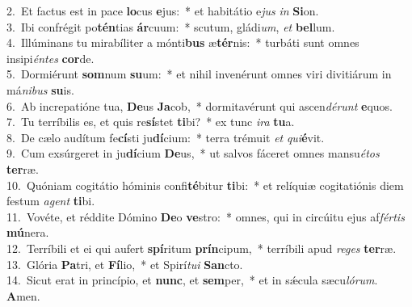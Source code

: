 {2.~}Et factus est in pace \textbf{lo}cus \textbf{e}jus:~* et habitátio e\textit{jus} \textit{in} \textbf{Si}on.\\
{3.~}Ibi confrégit po\textbf{tén}tias \textbf{ár}cuum:~* scutum, gládi\textit{um}, \textit{et} \textbf{bel}lum.\\
{4.~}Illúminans tu mirabíliter a mónti\textbf{bus} æ\textbf{tér}nis:~* turbáti sunt omnes insipi\textit{én}\textit{tes} \textbf{cor}de.\\
{5.~}Dormiérunt \textbf{som}num \textbf{su}um:~* et nihil invenérunt omnes viri divitiárum in má\textit{ni}\textit{bus} \textbf{su}is.\\
{6.~}Ab increpatióne tua, \textbf{De}us \textbf{Ja}cob,~* dormitavérunt qui ascen\textit{dé}\textit{runt} \textbf{e}quos.\\
{7.~}Tu terríbilis es, et quis re\textbf{sí}stet \textbf{ti}bi?~* ex tunc \textit{i}\textit{ra} \textbf{tu}a.\\
{8.~}De cælo audítum fe\textbf{cí}sti ju\textbf{dí}cium:~* terra trémuit \textit{et} \textit{qui}\textbf{é}vit.\\
{9.~}Cum exsúrgeret in ju\textbf{dí}cium \textbf{De}us,~* ut salvos fáceret omnes mansu\textit{é}\textit{tos} \textbf{ter}ræ.\\
{10.~}Quóniam cogitátio hóminis confi\textbf{té}bitur \textbf{ti}bi:~* et relíquiæ cogitatiónis diem festum \textit{a}\textit{gent} \textbf{ti}bi.\\
{11.~}Vovéte, et réddite Dómino \textbf{De}o \textbf{ve}stro:~* omnes, qui in circúitu ejus af\textit{fér}\textit{tis} \textbf{mú}nera.\\
{12.~}Terríbili et ei qui aufert \textbf{spí}ritum \textbf{prín}cipum,~* terríbili apud \textit{re}\textit{ges} \textbf{ter}ræ.\\
{13.~}Glória \textbf{Pa}tri, et \textbf{Fí}lio,~* et Spirí\textit{tu}\textit{i} \textbf{San}cto.\\
{14.~}Sicut erat in princípio, et \textbf{nunc}, et \textbf{sem}per,~* et in sǽcula sæcu\textit{ló}\textit{rum}. \textbf{A}men.\\
